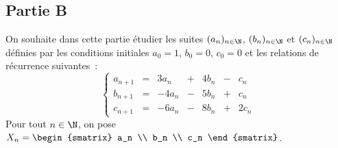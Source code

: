 \documentclass[11pt]{article}%
\begin{document}
 \newpage
 
 \subsection*{Partie B}

 \noindent 
 On souhaite dans cette partie étudier les suites $(a_n)_{n 
 \in \N}$, $(b_n)_{n \in \N}$ et $(c_n)_{n \in 
 \N}$ définies par les conditions initiales $a_0=1$, $b_0=0$, 
 $c_0=0$ et les relations de récurrence suivantes~:
 \[ 
  \left\{ 
  \begin{array}{rcrrrrr} 
  a_{n+1} & = & 3 a_n & + & 4 b_n & - & c_n \\ 
  b_{n+1} & = & -4 a_n & - & 5 b_n & + & c_n \\ 
  c_{n+1} & = & -6 a_n & - & 8 b_n & + & 2 c_n 
  \end{array} 
  \right. 
 \]
 Pour tout $n \in \N$, on pose $X_n = 
 \begin{smatrix} 
 a_n \\ 
 b_n \\ 
 c_n 
 \end{smatrix}$.
\end{document}
